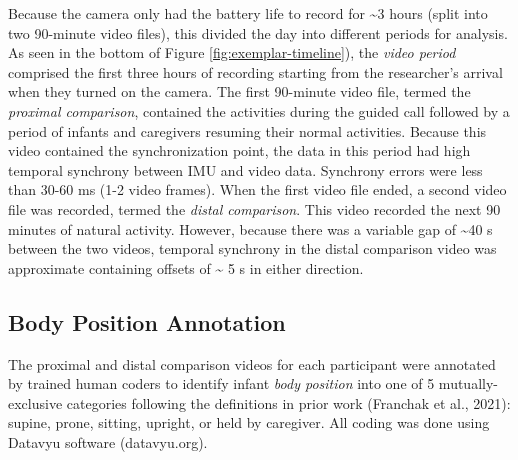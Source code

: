 \documentclass[
  man]{apa6}
\begin{document}
Because the camera only had the battery life to record for \textasciitilde3 hours (split into two 90-minute video files), this divided the day into different periods for analysis. As seen in the bottom of Figure \ref{fig:exemplar-timeline}), the \emph{video period} comprised the first three hours of recording starting from the researcher's arrival when they turned on the camera. The first 90-minute video file, termed the \emph{proximal comparison}, contained the activities during the guided call followed by a period of infants and caregivers resuming their normal activities. Because this video contained the synchronization point, the data in this period had high temporal synchrony between IMU and video data. Synchrony errors were less than 30-60 ms (1-2 video frames). When the first video file ended, a second video file was recorded, termed the \emph{distal comparison}. This video recorded the next 90 minutes of natural activity. However, because there was a variable gap of \textasciitilde40 s between the two videos, temporal synchrony in the distal comparison video was approximate containing offsets of \textasciitilde{} 5 s in either direction.

\hypertarget{body-position-annotation}{%
\subsection{Body Position Annotation}\label{body-position-annotation}}

The proximal and distal comparison videos for each participant were annotated by trained human coders to identify infant \emph{body position} into one of 5 mutually-exclusive categories following the definitions in prior work (Franchak et al., 2021): supine, prone, sitting, upright, or held by caregiver. All coding was done using Datavyu software (datavyu.org).
\end{document}
